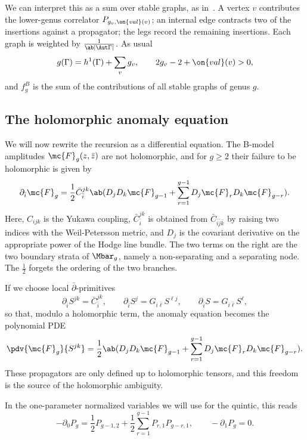 We can interpret this as a sum over stable graphs, as in~. A vertex \(v\) contributes the lower-genus correlator \(P_{g_v, \on{val}(v)}\); an internal edge contracts two of the insertions against a propagator; the legs record the remaining insertions. Each graph is weighted by \(\frac{1}{\ab|\Aut \Gamma|}\). As usual
\[ g(\Gamma) = h^1(\Gamma) + \sum_v g_v, \qquad 2g_v - 2 + \on{val}(v) > 0, \]
and \(f_g^B\) is the sum of the contributions of all stable graphs of genus \(g\).

\subsection{The holomorphic anomaly equation}%
\label{sub:The holomorphic anomaly equation}

We will now rewrite the recursion as a differential equation. The B-model amplitudes \(\mc{F}_g(z,\bar{z})\) are not holomorphic, and for \(g \geq 2\) their failure to be holomorphic is given by
\[ \partial_{\bar{i}} \mc{F}_g = \frac{1}{2}\bar{C}_{\bar{i}}^{jk}\ab( D_j D_k \mc{F}_{g-1} + \sum_{r=1}^{g-1} D_j \mc{F}_r D_k \mc{F}_{g-r} ). \]
Here, \(C_{ijk}\) is the Yukawa coupling, \(\bar{C}_{\bar{i}}^{jk}\) is obtained from \(\bar{C}_{\bar{i}\bar{j}\bar{k}}\) by raising two indices with the Weil-Petersson metric, and \(D_j\) is the covariant derivative on the appropriate power of the Hodge line bundle. The two terms on the right are the two boundary strata of \(\Mbar_g\), namely a non-separating and a separating node. The \(\frac{1}{2}\) forgets the ordering of the two branches.

If we choose local \(\bar{\partial}\)-primitives
\[ \partial_{\bar{i}}S^{jk} = \bar{C}_{\bar{i}}^{jk}, \qquad \partial_{\bar{i}}S^j = G_{i\bar{\ell}}S^{\ell j}, \qquad \partial_{\bar{i}}S = G_{i\bar{\ell}}S^{\ell}, \]
so that, modulo a holomorphic term, the anomaly equation becomes the polynomial PDE
\[ \pdv{\mc{F}_g}{S^{jk}} = \frac{1}{2}\ab( D_jD_k \mc{F}_{g-1} + \sum_{r=1}^{g-1} D_j \mc{F}_r D_k \mc{F}_{g-r} ). \]
These propagators are only defined up to holomorphic tensors, and this freedom is the source of the holomorphic ambiguity.

\begin{rmk}
    In the one-parameter normalized variables we will use for the quintic, this reads
    \[ -\partial_0 P_g = \frac{1}{2}P_{g-1,2} + \frac{1}{2}\sum_{r=1}^{g-1}P_{r,1}P_{g-r,1}, \qquad -\partial_1 P_g = 0. \]
\end{rmk}

